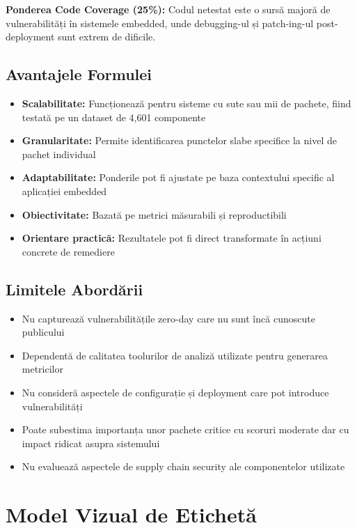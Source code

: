 \documentclass[12pt,a4paper]{article}
\begin{document}
\textbf{Ponderea Code Coverage (25\%):} Codul netestat este o sursă majoră de vulnerabilități în sistemele embedded, unde debugging-ul și patch-ing-ul post-deployment sunt extrem de dificile.

\subsection{Avantajele Formulei}

\begin{itemize}
\item \textbf{Scalabilitate:} Funcționează pentru sisteme cu sute sau mii de pachete, fiind testată pe un dataset de 4,601 componente
\item \textbf{Granularitate:} Permite identificarea punctelor slabe specifice la nivel de pachet individual
\item \textbf{Adaptabilitate:} Ponderile pot fi ajustate pe baza contextului specific al aplicației embedded
\item \textbf{Obiectivitate:} Bazată pe metrici măsurabili și reproductibili
\item \textbf{Orientare practică:} Rezultatele pot fi direct transformate în acțiuni concrete de remediere
\end{itemize}

\subsection{Limitele Abordării}

\begin{itemize}
\item Nu capturează vulnerabilitățile zero-day care nu sunt încă cunoscute publicului
\item Dependentă de calitatea toolurilor de analiză utilizate pentru generarea metricilor
\item Nu consideră aspectele de configurație și deployment care pot introduce vulnerabilități
\item Poate subestima importanța unor pachete critice cu scoruri moderate dar cu impact ridicat asupra sistemului
\item Nu evaluează aspectele de supply chain security ale componentelor utilizate
\end{itemize}

\section{Model Vizual de Etichetă}
\end{document}
